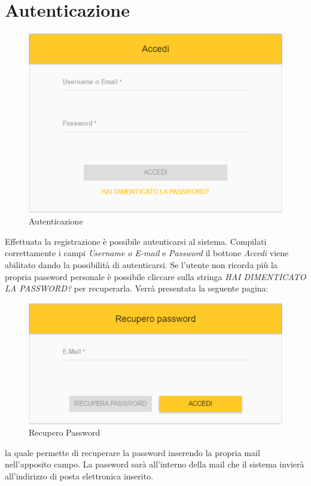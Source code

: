 \newpage
\section{Autenticazione}

\label{Autenticazione}
\begin{figure}[ht]
	\centering
	\includegraphics[scale=0.65]{img/autenticazione.png}
	\caption{Autenticazione}
\end{figure}
\FloatBarrier

Effettuata la registrazione è possibile autenticarsi al sistema. Compilati correttamente i campi \textit{Username o E-mail} e \textit{Password} il bottone \textit{Accedi} viene abilitato dando la possibilità di autenticarsi. Se l'utente non ricorda più la propria password personale è possibile cliccare sulla stringa \textit{HAI DIMENTICATO LA PASSWORD?} per recuperarla. Verrà presentata la seguente pagina:

\label{RecuperoPassword}
\begin{figure}[ht]
	\centering
	\includegraphics[scale=0.48]{img/recupero_password.png}
	\caption{Recupero Password}
\end{figure}
\FloatBarrier

la quale permette di recuperare la password inserendo la propria mail nell'apposito campo. La password sarà all'interno della mail che il sistema invierà all'indirizzo di posta elettronica inserito.  